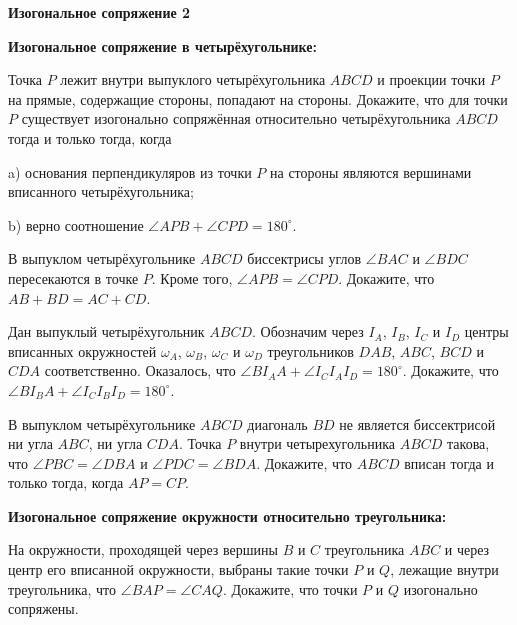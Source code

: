 \documentclass{article}
\begin{document}
    \large

    \begin{center}
        \textbf{Изогональное сопряжение 2}
    \end{center}


    \textbf{Изогональное сопряжение в четырёхугольнике:}

    \begin{enumerate_boxed}

        \item Точка $P$ лежит внутри выпуклого четырёхугольника $ABCD$ и проекции точки $P$ на прямые, содержащие стороны, попадают на стороны.
        Докажите, что для точки $P$ существует изогонально сопряжённая относительно четырёхугольника $ABCD$ тогда и только тогда, когда

        a) основания перпендикуляров из точки $P$ на стороны являются вершинами вписанного четырёхугольника;

        b) верно соотношение $\angle APB+\angle CPD=180^\circ$.

        \item  В выпуклом четырёхугольнике \(ABCD\) биссектрисы углов \(\angle BAC\) и \(\angle BDC\) пересекаются в точке \(P\).
        Кроме того, \(\angle APB = \angle CPD\).
        Докажите, что \(AB + BD = AC + CD\).

        \item  Дан выпуклый четырёхугольник \(ABCD\).
        Обозначим через \(I_A\), \(I_B\), \(I_C\) и \(I_D\) центры вписанных окружностей \(\omega_A\), \(\omega_B\), \(\omega_C\) и \(\omega_D\) треугольников \(DAB\), \(ABC\), \(BCD\) и \(CDA\) соответственно.
        Оказалось, что \(\angle BI_{A}A + \angle I_{C}I_{A}I_D = 180^\circ\).
        Докажите, что \(\angle BI_{B}A + \angle I_{C}I_{B}I_D = 180^\circ\).

        \item  В выпуклом четырёхугольнике \(ABCD\) диагональ \(BD\) не является биссектрисой ни угла \(ABC\), ни угла \(CDA\).
        Точка \(P\) внутри четырехугольника \(ABCD\) такова, что \(\angle PBC = \angle DBA\) и \(\angle PDC = \angle BDA\).
        Докажите, что \(ABCD\) вписан тогда и только тогда, когда \(AP = CP\).

        \textbf{Изогональное сопряжение окружности относительно треугольника:}

        \item  На окружности, проходящей через вершины \(B\) и \(C\) треугольника \(ABC\) и через центр его вписанной окружности, выбраны такие точки \(P\) и \(Q\), лежащие внутри треугольника, что \(\angle BAP = \angle CAQ\).
        Докажите, что точки \(P\) и \(Q\) изогонально сопряжены.


\end{enumerate_boxed}
\end{document}
